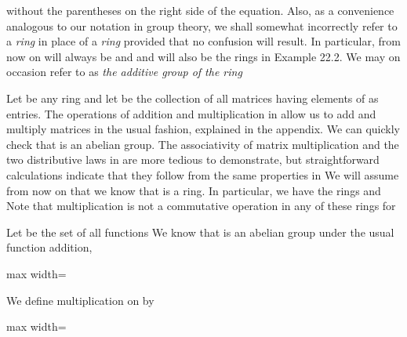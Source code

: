 \documentclass[11pt,oneside]{article}
\begin{document}
\begin{BookBody}
\noindent without the parentheses on the right side of the equation. Also, as a convenience analogous to our notation in group theory, we shall somewhat incorrectly refer to a\textit{ ring}  in place of a\textit{ ring}  provided that no confusion will result. In particular, from now on  will always be  and  and  will also be the rings in Example 22.2. We may on occasion refer to  as\textit{ the additive group of the ring} 

 Let  be any ring and let  be the collection of all  matrices having elements of  as entries. The operations of addition and multiplication in  allow us to add and multiply matrices in the usual fashion, explained in the appendix. We can quickly check that  is an abelian group. The associativity of matrix multiplication and the two distributive laws in  are more tedious to demonstrate, but straightforward calculations indicate that they follow from the same properties in  We will assume from now on that we know that  is a ring. In particular, we have the rings  and  Note that multiplication is not a commutative operation in any of these rings for \BookEnd{\blacktriangle}

 Let  be the set of all functions  We know that  is an abelian group under the usual function addition,

\begin{center}\begin{adjustbox}{max width=\linewidth}\end{adjustbox}\end{center}

\noindent We define multiplication on  by

\begin{center}\begin{adjustbox}{max width=\linewidth}\end{adjustbox}\end{center}


\end{BookBody}
\end{document}
